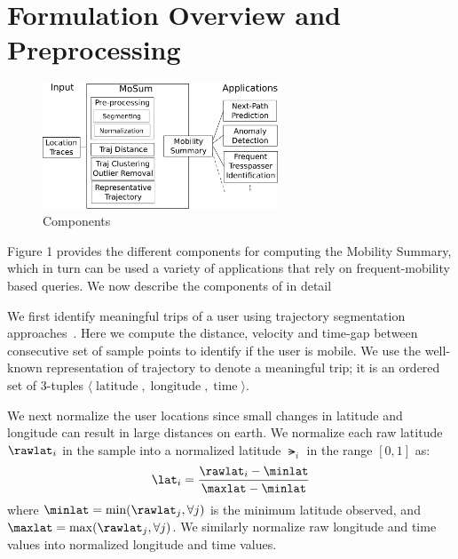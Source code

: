 \section{Formulation Overview and Preprocessing}
\begin{figure}[!htb]
\centering
\includegraphics[width=7cm]{figs/overview.pdf}
\caption{\trajSummary Components}
\label{fig:components}
\end{figure}

Figure 1 provides the different components for computing the Mobility Summary, which in turn can be used a variety of applications that rely on frequent-mobility based queries. We now describe the components of \trajSummary in detail


We first identify meaningful trips of a user using trajectory segmentation approaches~\cite{Zheng2008}. Here we compute the distance, velocity and time-gap between consecutive set of sample points to identify if the user is mobile. We use the well-known representation of trajectory to denote a meaningful trip; it is an ordered set of 3-tuples $\langle \operatorname{latitude},\operatorname{longitude},\operatorname{time} \rangle$.

We next normalize the user locations since small changes in latitude and longitude can result in large distances on earth. We normalize each raw latitude $\rawlat_i$ in the sample into a normalized latitude $\lat_i$ in the range $[0,1]$ as:
\begin{eqnarray}
\lat_i =\frac{\rawlat_i - \minlat}{\maxlat - \minlat}
\end{eqnarray}
where $\minlat=\min(\rawlat_j, \forall j)$ is the minimum latitude observed, and $\maxlat=\max(\rawlat_j, \forall j)$. We similarly normalize raw longitude and time values into normalized longitude and time values.

